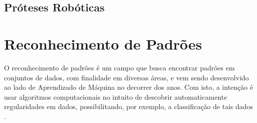 \subsection{Próteses Robóticas}







\section{Reconhecimento de Padrões}
\label{sec:patternrec}
O reconhecimento de padrões é um campo que busca encontrar padrões em conjuntos de dados, com finalidade em diversas áreas, e vem sendo desenvolvido ao lado de Aprendizado de Máquina no decorrer dos anos. Com isto, a intenção é usar algoritmos computacionais no intuito de descobrir automaticamente regularidades em dados, possibilitando, por exemplo, a classificação de tais dados \cite{bishop:2006}.

